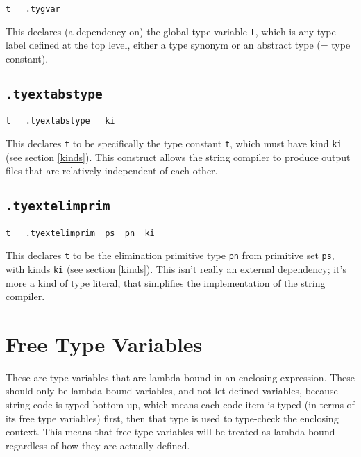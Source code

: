 \documentclass{report}
\newcommand\stringcode[1]{\texttt{#1}}
\begin{document}
\begin{verbatim}
t	.tygvar
\end{verbatim}

This declares (a dependency on) the global type variable \stringcode{t},
which is any type label defined at the top level, either a type synonym or an abstract type (= type constant).

\subsection{\stringcode{.tyextabstype}}

\begin{verbatim}
t	.tyextabstype	ki
\end{verbatim}

This declares \stringcode{t} to be specifically the type constant \stringcode{t},
which must have kind \stringcode{ki} (see section \ref{kinds}).
This construct allows the string compiler to produce output files that are relatively independent of each other.

\subsection{\stringcode{.tyextelimprim}}

\begin{verbatim}
t	.tyextelimprim	ps	pn	ki
\end{verbatim}

This declares \stringcode{t} to be the elimination primitive type \stringcode{pn} from primitive set \stringcode{ps},
with kinds \stringcode{ki} (see section \ref{kinds}).
This isn't really an external dependency;
it's more a kind of type literal, that simplifies the implementation of the string compiler.

\section{Free Type Variables}
\label{type_fv}

These are type variables that are lambda-bound in an enclosing expression.
These should only be lambda-bound variables, and not let-defined variables, because string code is typed bottom-up,
which means each code item is typed (in terms of its free type variables) first, then that type is used to type-check the enclosing context.
This means that free type variables will be treated as lambda-bound regardless of how they are actually defined.
\end{document}
